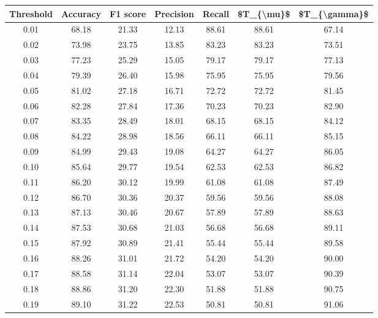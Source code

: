 \begin{tabular}{|c|c|c|c|c|c|c|}
\hline
 Threshold &  Accuracy &  F1 score &  Precision &  Recall &  \$T\_\{\textbackslash mu\}\$ &  \$T\_\{\textbackslash gamma\}\$ \\
\hline
      0.01 &     68.18 &     21.33 &      12.13 &   88.61 &      88.61 &         67.14 \\
      0.02 &     73.98 &     23.75 &      13.85 &   83.23 &      83.23 &         73.51 \\
      0.03 &     77.23 &     25.29 &      15.05 &   79.17 &      79.17 &         77.13 \\
      0.04 &     79.39 &     26.40 &      15.98 &   75.95 &      75.95 &         79.56 \\
      0.05 &     81.02 &     27.18 &      16.71 &   72.72 &      72.72 &         81.45 \\
      0.06 &     82.28 &     27.84 &      17.36 &   70.23 &      70.23 &         82.90 \\
      0.07 &     83.35 &     28.49 &      18.01 &   68.15 &      68.15 &         84.12 \\
      0.08 &     84.22 &     28.98 &      18.56 &   66.11 &      66.11 &         85.15 \\
      0.09 &     84.99 &     29.43 &      19.08 &   64.27 &      64.27 &         86.05 \\
      0.10 &     85.64 &     29.77 &      19.54 &   62.53 &      62.53 &         86.82 \\
      0.11 &     86.20 &     30.12 &      19.99 &   61.08 &      61.08 &         87.49 \\
      0.12 &     86.70 &     30.36 &      20.37 &   59.56 &      59.56 &         88.08 \\
      0.13 &     87.13 &     30.46 &      20.67 &   57.89 &      57.89 &         88.63 \\
      0.14 &     87.53 &     30.68 &      21.03 &   56.68 &      56.68 &         89.11 \\
      0.15 &     87.92 &     30.89 &      21.41 &   55.44 &      55.44 &         89.58 \\
      0.16 &     88.26 &     31.01 &      21.72 &   54.20 &      54.20 &         90.00 \\
      0.17 &     88.58 &     31.14 &      22.04 &   53.07 &      53.07 &         90.39 \\
      0.18 &     88.86 &     31.20 &      22.30 &   51.88 &      51.88 &         90.75 \\
      0.19 &     89.10 &     31.22 &      22.53 &   50.81 &      50.81 &         91.06 \\

\end{tabular}

